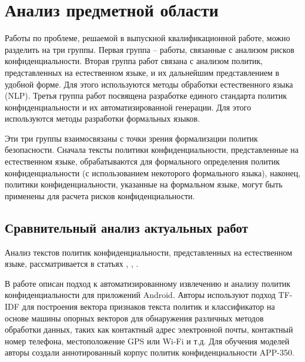 \documentclass[../main]{subfiles}
\begin{document}
\newpage
\section{Анализ предметной области}

Работы по проблеме, решаемой в выпускной квалификационной работе, можно разделить на три группы. Первая группа -- работы, связанные с анализом рисков конфиденциальности. Вторая группа работ связана с анализом политик, представленных на естественном языке, и их дальнейшим представлением в удобной форме. Для этого используются методы обработки естественного языка (NLP). Третья группа работ посвящена разработке единого стандарта политик конфиденциальности и их автоматизированной генерации. Для этого используются методы разработки формальных языков.

Эти три группы взаимосвязаны с точки зрения формализации политик безопасности. Сначала тексты политики конфиденциальности, представленные на естественном языке, обрабатываются для формального определения политик конфиденциальности (с использованием некоторого формального языка), наконец, политики конфиденциальности, указанные на формальном языке, могут быть применены для расчета рисков конфиденциальности.

\subsection{Сравнительный анализ актуальных работ}
Анализ текстов политик конфиденциальности, представленных на естественном языке, рассматривается в статьях \cite{MDPI5}, \cite{MDPI6}, \cite{MDPI9}.

В работе \cite{MDPI5} описан подход к автоматизированному извлечению и анализу политик конфиденциальности для приложений Android. Авторы используют подход TF-IDF для построения вектора признаков текста политик и классификатор на основе машины опорных векторов для обнаружения различных методов обработки данных, таких как контактный адрес электронной почты, контактный номер телефона, местоположение GPS или Wi-Fi и т.д. Для обучения моделей авторы создали аннотированный корпус политик конфиденциальности APP-350.
\end{document}
